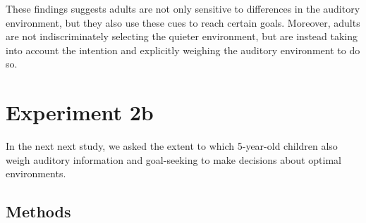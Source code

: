 \documentclass[10pt, letterpaper]{article}
\begin{document}
These findings suggests adults are not only sensitive to differences in
the auditory environment, but they also use these cues to reach certain
goals. Moreover, adults are not indiscriminately selecting the quieter
environment, but are instead taking into account the intention and
explicitly weighing the auditory environment to do so.

\hypertarget{experiment-2b}{%
\section{\texorpdfstring{\textbf{Experiment
2b}}{Experiment 2b}}\label{experiment-2b}}

In the next next study, we asked the extent to which 5-year-old children
also weigh auditory information and goal-seeking to make decisions about
optimal environments.

\hypertarget{methods-3}{%
\subsection{\texorpdfstring{\textbf{Methods}}{Methods}}\label{methods-3}}
\end{document}
